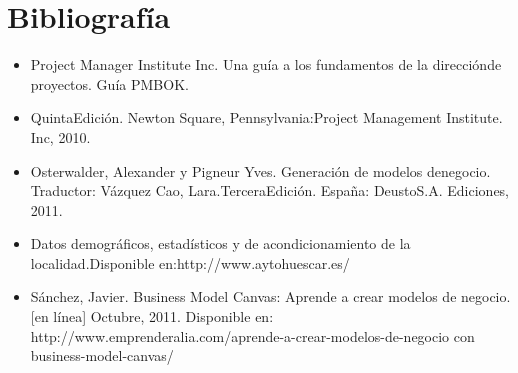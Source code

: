  \section{Bibliografía} 
 \begin{itemize}
\item Project Manager Institute Inc. Una guía a los fundamentos de la direcciónde proyectos. Guía PMBOK.

\item QuintaEdición. Newton Square, Pennsylvania:Project Management Institute. Inc, 2010.

\item Osterwalder, Alexander y Pigneur Yves. Generación de modelos denegocio. Traductor: Vázquez Cao, Lara.TerceraEdición. España: DeustoS.A. Ediciones, 2011.

\item Datos demográficos, estadísticos y de acondicionamiento de la localidad.Disponible en:http://www.aytohuescar.es/ 
\item Sánchez, Javier. Business Model Canvas: Aprende a crear modelos de negocio.
[en línea] Octubre, 2011. Disponible en: http://www.emprenderalia.com/aprende-a-crear-modelos-de-negocio con business-model-canvas/
\end{itemize}

